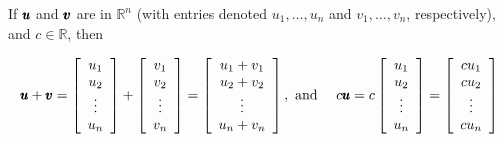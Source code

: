 \begin{example}
    If $\pmb{u}$ and $\pmb{v}$ are in $\mathbb{R}^n$ (with entries denoted $u_1, \ldots, u_n$ and $v_1, \ldots, v_n$, respectively), and $c \in \mathbb{R}$, then

    \[
    \begin{aligned}
    & \pmb{u} + \pmb{v} = {\left[\begin{array}{c}
    u_1 \\
    u_2 \\
    \vdots \\
    u_n
    \end{array}\right] + \left[\begin{array}{c}
    v_1 \\
    v_2 \\
    \vdots \\
    v_n
    \end{array}\right] = \left[\begin{array}{c}
    u_1 + v_1 \\
    u_2 + v_2 \\
    \vdots \\
    u_n + v_n
    \end{array}\right], \text { and } } 
    & c \pmb{u} = c\left[\begin{array}{c}
    u_1 \\
    u_2 \\
    \vdots \\
    u_n
    \end{array}\right] = \left[\begin{array}{c}
    c u_1 \\
    c u_2 \\
    \vdots \\
    c u_n
    \end{array}\right]
    \end{aligned}
    \]   
\end{example}

